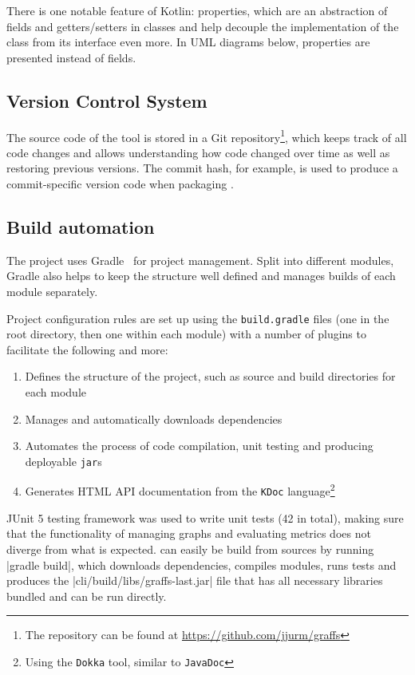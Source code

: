 There is one notable feature of Kotlin: properties, which are an abstraction of fields and getters/setters in classes and help decouple the implementation of the class from its interface even more.
In UML diagrams below, properties are presented instead of fields.

\subsection{Version Control System}

The source code of the \graffs tool is stored in a Git repository\footnote{The repository can be found at \url{https://github.com/jjurm/graffs}}, which keeps track of all code changes and allows understanding how code changed over time as well as restoring previous versions.
The commit hash, for example, is used to produce a commit-specific version code when packaging \graffs.

\subsection{Build automation}

The project uses Gradle~\cite{BerglundBuildingTestingGradle2011} for project management.
Split into different modules, Gradle also helps to keep the structure well defined and manages builds of each module separately.

Project configuration rules are set up using the \texttt{build.gradle} files (one in the root directory, then one within each module) with a number of plugins to facilitate the following and more:
\begin{enumerate}[topsep=5pt,itemsep=0pt]
    \item Defines the structure of the project, such as source and build directories for each module
    \item Manages and automatically downloads dependencies
    \item Automates the process of code compilation, unit testing and producing deployable \texttt{jar}s
    \item Generates HTML API documentation from the \texttt{KDoc} language\footnote{Using the \texttt{Dokka} tool, similar to \texttt{JavaDoc}}
\end{enumerate}

JUnit 5 testing framework was used to write unit tests (42 in total), making sure that the functionality of managing graphs and evaluating metrics does not diverge from what is expected.
\graffs can easily be build from sources by running |gradle build|, which downloads dependencies, compiles modules, runs tests and produces the |cli/build/libs/graffs-last.jar| file that has all necessary libraries bundled and can be run directly.

